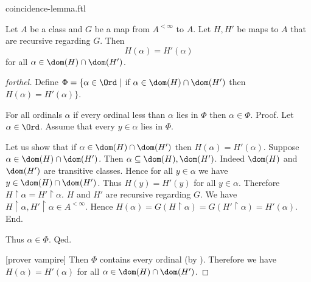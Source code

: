 \documentclass{naproche-library}
\begin{document}
\begin{smodule}[title=The Coincidence Lemma]{coincidence-lemma.ftl}
  
\begin{lemma*}[forthel,title=Coincidence Lemma,id=transfinite-recursion_coincidence]
  Let $A$ be a class and $G$ be a map from $A^{< \infty}$ to $A$.
  Let $H, H'$ be maps to $A$ that are recursive regarding $G$.
  Then \[ H(\alpha) = H'(\alpha) \] for all $\alpha \in \dom(H) \cap \dom(H')$.
\end{lemma*}
\begin{proof}[forthel]
  Define $\Phi = \{ \alpha \in \Ord \mid$ if
  $\alpha \in \dom(H) \cap \dom(H')$ then $H(\alpha) = H'(\alpha) \}$.

  For all ordinals $\alpha$ if every ordinal less than $\alpha$ lies in $\Phi$ then $\alpha \in \Phi$. \newline
  Proof.
    Let $\alpha \in \Ord$.
    Assume that every $y \in \alpha$ lies in $\Phi$.

    Let us show that if $\alpha \in \dom(H) \cap \dom(H')$ then
    $H(\alpha) = H'(\alpha)$.
      Suppose $\alpha \in \dom(H) \cap \dom(H')$.
      Then $\alpha \subseteq \dom(H), \dom(H')$.
      Indeed $\dom(H)$ and $\dom(H')$ are transitive classes.
      Hence for all $y \in \alpha$ we have $y \in \dom(H) \cap \dom(H')$.
      Thus $H(y) = H'(y)$ for all $y \in \alpha$.
      Therefore $H \restriction \alpha = H' \restriction \alpha$.
      $H$ and $H'$ are recursive regarding $G$.
      We have $H \restriction \alpha, H' \restriction \alpha \in A^{< \infty}$.
      Hence $H(\alpha)
        = G(H \restriction \alpha)
        = G(H' \restriction \alpha)
        = H'(\alpha)$.
    End.

    Thus $\alpha \in \Phi$.
  Qed.

  [prover vampire]
  Then $\Phi$ contains every ordinal (by ).
  Therefore we have $H(\alpha) = H'(\alpha)$ for all $\alpha \in \dom(H) \cap \dom(H')$.
\end{proof}
\end{smodule}
\end{document}
